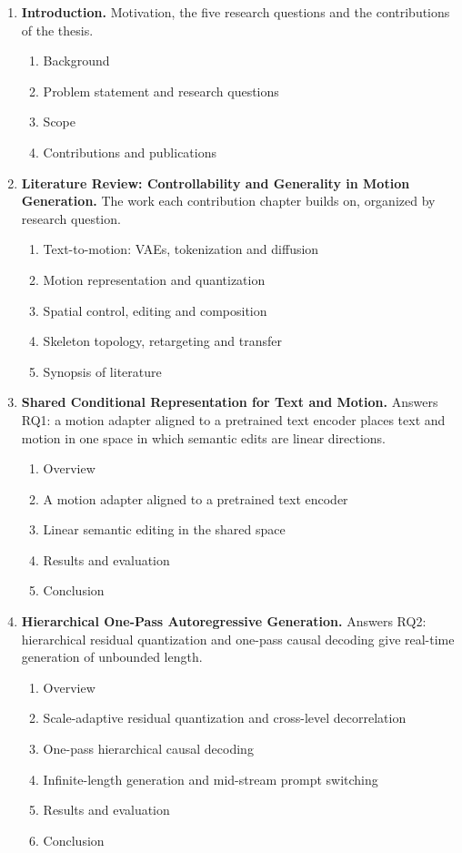 \documentclass[11pt,a4paper]{report}
\begin{document}
\begin{enumerate}[leftmargin=1.4em]
\item \textbf{Introduction.} Motivation, the five research questions and the
  contributions of the thesis.
  \begin{enumerate}[leftmargin=1.4em]
  \item Background
  \item Problem statement and research questions
  \item Scope
  \item Contributions and publications
  \end{enumerate}

\item \textbf{Literature Review: Controllability and Generality in Motion
  Generation.} The work each contribution chapter builds on, organized by
  research question.
  \begin{enumerate}[leftmargin=1.4em]
  \item Text-to-motion: VAEs, tokenization and diffusion
  \item Motion representation and quantization
  \item Spatial control, editing and composition
  \item Skeleton topology, retargeting and transfer
  \item Synopsis of literature
  \end{enumerate}

\item \textbf{Shared Conditional Representation for Text and Motion.} Answers
  RQ1: a motion adapter aligned to a pretrained text encoder places text and
  motion in one space in which semantic edits are linear directions.
  \begin{enumerate}[leftmargin=1.4em]
  \item Overview
  \item A motion adapter aligned to a pretrained text encoder
  \item Linear semantic editing in the shared space
  \item Results and evaluation
  \item Conclusion
  \end{enumerate}

\item \textbf{Hierarchical One-Pass Autoregressive Generation.} Answers RQ2:
  hierarchical residual quantization and one-pass causal decoding give
  real-time generation of unbounded length.
  \begin{enumerate}[leftmargin=1.4em]
  \item Overview
  \item Scale-adaptive residual quantization and cross-level decorrelation
  \item One-pass hierarchical causal decoding
  \item Infinite-length generation and mid-stream prompt switching
  \item Results and evaluation
  \item Conclusion
  \end{enumerate}


\end{enumerate}
\end{document}
